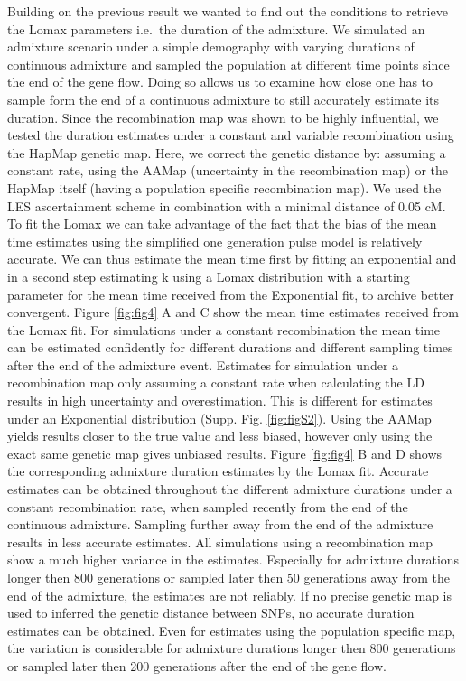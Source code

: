 \documentclass[]{article}
\begin{document}
Building on the previous
result we wanted to find out the conditions to retrieve the Lomax
parameters i.e.~the duration of the admixture. We simulated an admixture
scenario under a simple demography with varying durations of continuous
admixture and sampled the population at different time points since the
end of the gene flow. Doing so allows us to examine how close one has to
sample form the end of a continuous admixture to still accurately
estimate its duration. Since the recombination map was shown to be highly
influential, we tested the duration estimates under a constant and variable
recombination using the HapMap genetic map. Here, we correct the
genetic distance by: assuming a constant rate, using the AAMap (uncertainty in the recombination map) or the
HapMap itself (having a  population specific recombination map). We used the LES ascertainment scheme in combination with
a minimal distance of 0.05 cM. To fit the Lomax we can take advantage of
the fact that the bias of the mean time estimates using the simplified
one generation pulse model is relatively accurate. We can thus estimate
the mean time first by fitting an exponential and in a second step estimating k
using a Lomax distribution with a starting parameter for the mean time received
from the Exponential fit, to archive better convergent. Figure \ref{fig:fig4} A and C show the mean
time estimates received from the Lomax fit. For simulations under a
constant recombination the mean time can be estimated confidently for different durations and different sampling times after the end of the admixture event. Estimates for simulation under a recombination map only
assuming a constant rate when calculating the LD results in high uncertainty and overestimation. This is different for estimates under an Exponential distribution (Supp. Fig.  \ref{fig:figS2}). Using the AAMap yields
results closer to the true value and less biased, however only
using the exact same genetic map gives unbiased results. Figure
\ref{fig:fig4} B and D shows the corresponding admixture duration estimates by the
Lomax fit. Accurate estimates can be obtained throughout the different
admixture durations under a constant recombination rate, when sampled
recently from the end of the continuous admixture. Sampling further away from the end of the admixture results in less accurate estimates.  All simulations using a recombination map show a much higher
variance in the estimates. Especially for admixture durations longer then
800 generations or sampled later then 50 generations away from the end
of the admixture, the estimates are not reliably. If no precise genetic map
is used to inferred the genetic distance between SNPs, no accurate
duration estimates can be obtained. Even for estimates using the population specific map, the variation is considerable for admixture durations longer then 800 generations or sampled later then 200 generations after the end of the gene flow.
\end{document}
